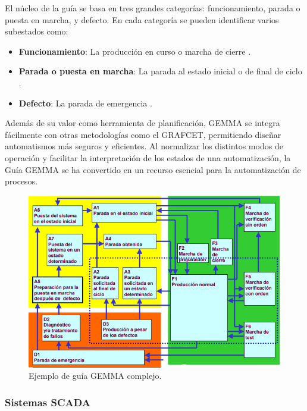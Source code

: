 El núcleo de la guía se basa en tres grandes categorías: funcionamiento, parada o puesta en marcha, y defecto. En cada categoría se pueden identificar varios subestados como:

\begin{itemize}
  \item  \textbf{Funcionamiento}: La producción en curso o marcha de cierre \cite{guia_gemma}.
  \item \textbf{Parada o puesta en marcha}: La parada al estado inicial o de final de ciclo \cite{guia_gemma}.
  \item \textbf{Defecto}: La parada de emergencia \cite{guia_gemma}. 
\end{itemize} 

Además de su valor como herramienta de planificación, GEMMA se integra fácilmente con otras metodologías como el GRAFCET, permitiendo diseñar automatismos más seguros y eficientes. Al normalizar los distintos modos de operación y facilitar la interpretación de los estados de una automatización, la Guía GEMMA se ha convertido en un recurso esencial para la automatización de procesos.

\begin{figure} [h!]
  \begin{center}
    \includegraphics[width=15cm]{figs/guia_gemma}
  \end{center}
  \caption{\centering Ejemplo de guía GEMMA complejo. \cite{guia_gemma}}
  \label{fig:guia_gemma}
\end{figure} 

\subsubsection{Sistemas SCADA}

